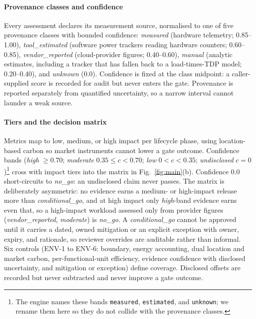 \documentclass[10pt,conference]{IEEEtran}
\begin{document}
\paragraph{Provenance classes and confidence} Every assessment declares its
measurement source, normalised to one of five provenance classes with bounded
confidence: \emph{measured} (hardware telemetry; 0.85--1.00),
\emph{tool\_estimated} (software power trackers reading hardware counters;
0.60--0.85), \emph{vendor\_reported} (cloud-provider figures; 0.40--0.60),
\emph{manual} (analytic estimates, including a tracker that has fallen back to
a load-times-TDP model; 0.20--0.40), and \emph{unknown} (0.0). Confidence is
fixed at the class midpoint: a caller-supplied score is recorded for audit but
never enters the gate. Provenance is reported separately from quantified
uncertainty, so a narrow interval cannot launder a weak source.

\paragraph{Tiers and the decision matrix} Metrics map to low, medium, or high
impact per lifecycle phase, using location-based carbon so market instruments
cannot lower a gate outcome. Confidence bands (\emph{high} $\geq 0.70$;
\emph{moderate} $0.35 \leq c < 0.70$; \emph{low} $0 < c < 0.35$;
\emph{undisclosed} $c = 0$)\footnote{The engine names these bands
\texttt{measured}, \texttt{estimated}, and \texttt{unknown}; we rename them
here so they do not collide with the provenance classes.} cross with impact
tiers into the matrix in Fig.~\ref{fig:main}(b). Confidence 0.0 short-circuits
to \emph{no\_go}: an undisclosed claim never passes. The matrix is deliberately
asymmetric: no evidence earns a medium- or high-impact release more than
\emph{conditional\_go}, and at high impact only \emph{high}-band evidence earns
even that, so a high-impact workload assessed only from provider figures
(\emph{vendor\_reported}, \emph{moderate}) is \emph{no\_go}. A \emph{conditional\_go} cannot be approved until it
carries a dated, owned mitigation or an explicit exception with owner, expiry,
and rationale, so reviewer overrides are auditable rather than informal. Six
controls (ENV-1 to ENV-6: boundary, energy accounting, dual location and market
carbon, per-functional-unit efficiency, evidence confidence with disclosed
uncertainty, and mitigation or exception) define coverage. Disclosed offsets
are recorded but never subtracted and never improve a gate outcome.
\end{document}
